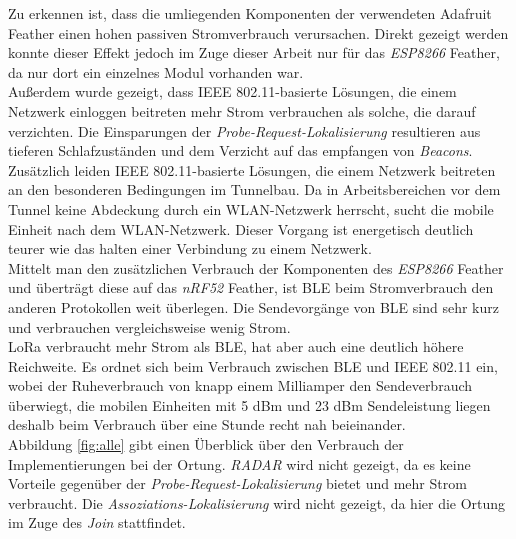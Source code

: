 Zu erkennen ist, dass die umliegenden Komponenten der verwendeten Adafruit Feather einen hohen passiven Stromverbrauch verursachen.
Direkt gezeigt werden konnte dieser Effekt jedoch im Zuge dieser Arbeit nur für das \emph{ESP8266} Feather, da nur dort ein einzelnes Modul vorhanden war.\\
Außerdem wurde gezeigt, dass IEEE 802.11-basierte Lösungen, die einem Netzwerk einloggen beitreten mehr Strom verbrauchen als solche, die darauf verzichten.
Die Einsparungen der \emph{Probe-Request-Lokalisierung} resultieren aus tieferen Schlafzuständen und dem Verzicht auf das empfangen von \emph{Beacons}.
Zusätzlich leiden IEEE 802.11-basierte Lösungen, die einem Netzwerk beitreten an den besonderen Bedingungen im Tunnelbau.
Da in Arbeitsbereichen vor dem Tunnel keine Abdeckung durch ein WLAN-Netzwerk herrscht, sucht die mobile Einheit nach dem WLAN-Netzwerk.
Dieser Vorgang ist energetisch deutlich teurer wie das halten einer Verbindung zu einem Netzwerk.\\
Mittelt man den zusätzlichen Verbrauch der Komponenten des \emph{ESP8266} Feather und überträgt diese auf das \emph{nRF52} Feather, ist BLE beim Stromverbrauch den anderen Protokollen weit überlegen.
Die Sendevorgänge von BLE sind sehr kurz und verbrauchen vergleichsweise wenig Strom.\\
LoRa verbraucht mehr Strom als BLE, hat aber auch eine deutlich höhere Reichweite.
Es ordnet sich beim Verbrauch zwischen BLE und IEEE 802.11 ein, wobei der Ruheverbrauch von knapp einem Milliamper den Sendeverbrauch überwiegt, die mobilen Einheiten mit 5 dBm und 23 dBm Sendeleistung liegen deshalb beim Verbrauch über eine Stunde recht nah beieinander.\\
Abbildung \ref{fig:alle} gibt einen Überblick über den Verbrauch der Implementierungen bei der Ortung. 
\emph{RADAR} wird nicht gezeigt, da es keine Vorteile gegenüber der \emph{Probe-Request-Lokalisierung} bietet und mehr Strom verbraucht.
Die \emph{Assoziations-Lokalisierung} wird nicht gezeigt, da hier die Ortung im Zuge des \emph{Join} stattfindet.

